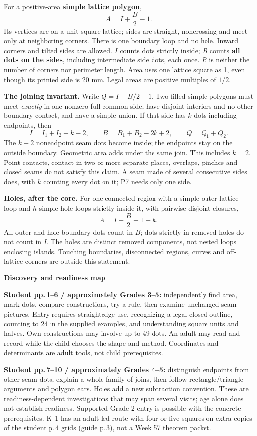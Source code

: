 \documentclass[letterpaper,11pt]{article}
\newcommand{\heading}[1]{\vspace{3pt}{\large\bfseries #1}\par}
\newcommand{\subhead}[1]{\vspace{2pt}\textbf{#1}\par}
\begin{document}
\heading{Mathematical destination: Pick's theorem}
For a positive-area \textbf{simple lattice polygon},
\[A=I+\frac B2-1.\]
Its vertices are on a unit square lattice; sides are straight, noncrossing and meet only at neighboring corners. There is one boundary loop and no hole. Inward corners and tilted sides are allowed. $I$ counts dots strictly inside; $B$ counts \textbf{all dots on the sides}, including intermediate side dots, each once. $B$ is neither the number of corners nor perimeter length. Area uses one lattice square as 1, even though its printed side is 20 mm. Legal areas are positive multiples of $1/2$.

\textbf{The joining invariant.} Write $Q=I+B/2-1$. Two filled simple polygons must meet \emph{exactly} in one nonzero full common side, have disjoint interiors and no other boundary contact, and have a simple union. If that side has $k$ dots including endpoints, then
\[I=I_1+I_2+k-2,\qquad B=B_1+B_2-2k+2,\qquad Q=Q_1+Q_2.\]
The $k-2$ nonendpoint seam dots become inside; the endpoints stay on the outside boundary. Geometric area adds under the same join. This includes $k=2$. Point contacts, contact in two or more separate places, overlaps, pinches and closed seams do not satisfy this claim. A seam made of several consecutive sides does, with $k$ counting every dot on it; P7 needs only one side.

\textbf{Holes, after the core.} For one connected region with a simple outer lattice loop and $h$ simple hole loops strictly inside it, with pairwise disjoint closures,
\[A=I+\frac B2-1+h.\]
All outer and hole-boundary dots count in $B$; dots strictly in removed holes do not count in $I$. The holes are distinct removed components, not nested loops enclosing islands. Touching boundaries, disconnected regions, curves and off-lattice corners are outside this statement.

\subhead{Discovery and readiness map}
\textbf{Student pp.\,1--6 / approximately Grades 3--5:} independently find area, mark dots, compare constructions, try a rule, then examine unchanged seam pictures. Entry requires straightedge use, recognizing a legal closed outline, counting to 24 in the supplied examples, and understanding square units and halves. Own constructions may involve up to 49 dots. An adult may read and record while the child chooses the shape and method. Coordinates and determinants are adult tools, not child prerequisites.

\textbf{Student pp.\,7--10 / approximately Grades 4--5:} distinguish endpoints from other seam dots, explain a whole family of joins, then follow rectangle/triangle arguments and polygon ears. Holes add a new subtraction convention. These are readiness-dependent investigations that may span several visits; age alone does not establish readiness. Supported Grade 2 entry is possible with the concrete prerequisites. K--1 has an adult-led route with four or five squares on extra copies of the student p.\,4 grids (guide p.\,3), not a Week 57 theorem packet.
\end{document}
